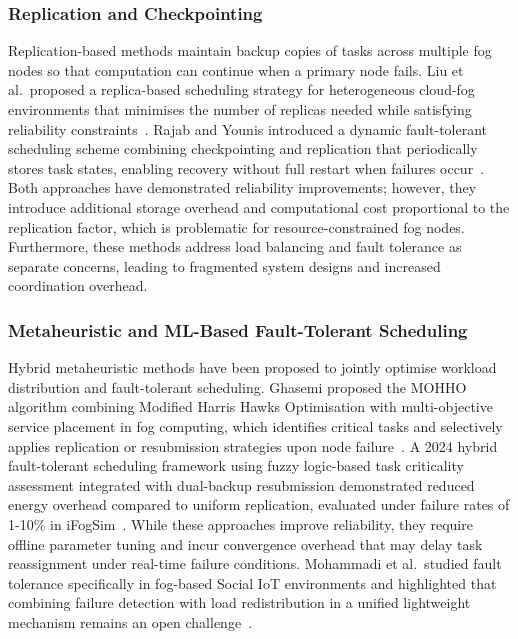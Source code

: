 \documentclass[conference]{IEEEtran}
\begin{document}
\subsubsection{Replication and Checkpointing}

Replication-based methods maintain backup copies of tasks across multiple fog nodes so that computation can continue when a primary node fails. Liu et al.\ proposed a replica-based scheduling strategy for heterogeneous cloud-fog environments that minimises the number of replicas needed while satisfying reliability constraints~\cite{liu2024}. Rajab and Younis introduced a dynamic fault-tolerant scheduling scheme combining checkpointing and replication that periodically stores task states, enabling recovery without full restart when failures occur~\cite{rajab2021}. Both approaches have demonstrated reliability improvements; however, they introduce additional storage overhead and computational cost proportional to the replication factor, which is problematic for resource-constrained fog nodes. Furthermore, these methods address load balancing and fault tolerance as separate concerns, leading to fragmented system designs and increased coordination overhead.

\subsubsection{Metaheuristic and ML-Based Fault-Tolerant Scheduling}

Hybrid metaheuristic methods have been proposed to jointly optimise workload distribution and fault-tolerant scheduling. Ghasemi proposed the MOHHO algorithm combining Modified Harris Hawks Optimisation with multi-objective service placement in fog computing, which identifies critical tasks and selectively applies replication or resubmission strategies upon node failure~\cite{ghasemi2024}. A 2024 hybrid fault-tolerant scheduling framework using fuzzy logic-based task criticality assessment integrated with dual-backup resubmission demonstrated reduced energy overhead compared to uniform replication, evaluated under failure rates of 1-10\% in iFogSim~\cite{merah2024}. While these approaches improve reliability, they require offline parameter tuning and incur convergence overhead that may delay task reassignment under real-time failure conditions. Mohammadi et al.\ studied fault tolerance specifically in fog-based Social IoT environments and highlighted that combining failure detection with load redistribution in a unified lightweight mechanism remains an open challenge~\cite{mohammadi2023}.
\end{document}
